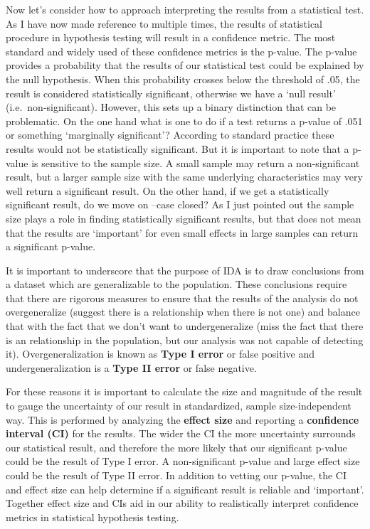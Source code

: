 \documentclass[
  letterpaper,
]{latex/krantz}
\begin{document}
Now let's consider how to approach interpreting the results from a
statistical test. As I have now made reference to multiple times, the
results of statistical procedure in hypothesis testing will result in a
confidence metric. The most standard and widely used of these confidence
metrics is the p-value. The p-value provides a probability that the
results of our statistical test could be explained by the null
hypothesis. When this probability crosses below the threshold of .05,
the result is considered statistically significant, otherwise we have a
`null result' (i.e.~non-significant). However, this sets up a binary
distinction that can be problematic. On the one hand what is one to do
if a test returns a p-value of .051 or something `marginally
significant'? According to standard practice these results would not be
statistically significant. But it is important to note that a p-value is
sensitive to the sample size. A small sample may return a
non-significant result, but a larger sample size with the same
underlying characteristics may very well return a significant result. On
the other hand, if we get a statistically significant result, do we move
on --case closed? As I just pointed out the sample size plays a role in
finding statistically significant results, but that does not mean that
the results are `important' for even small effects in large samples can
return a significant p-value.

It is important to underscore that the purpose of IDA is to draw
conclusions from a dataset which are generalizable to the population.
These conclusions require that there are rigorous measures to ensure
that the results of the analysis do not overgeneralize (suggest there is
a relationship when there is not one) and balance that with the fact
that we don't want to undergeneralize (miss the fact that there is an
relationship in the population, but our analysis was not capable of
detecting it). Overgeneralization is known as \textbf{Type I error} or
false positive and undergeneralization is a \textbf{Type II error} or
false negative.

For these reasons it is important to calculate the size and magnitude of
the result to gauge the uncertainty of our result in standardized,
sample size-independent way. This is performed by analyzing the
\textbf{effect size} and reporting a \textbf{confidence interval (CI)}
for the results. The wider the CI the more uncertainty surrounds our
statistical result, and therefore the more likely that our significant
p-value could be the result of Type I error. A non-significant p-value
and large effect size could be the result of Type II error. In addition
to vetting our p-value, the CI and effect size can help determine if a
significant result is reliable and `important'. Together effect size and
CIs aid in our ability to realistically interpret confidence metrics in
statistical hypothesis testing.
\end{document}
